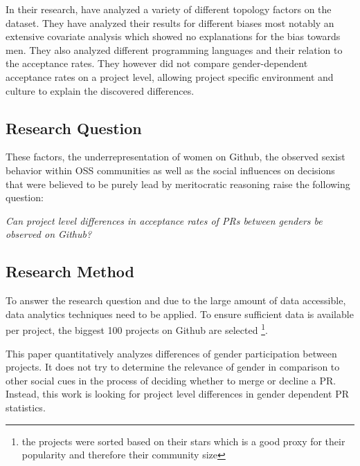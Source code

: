 In their research, \citeauthor{genderdiff:2016} have analyzed a variety of different topology factors on the dataset. They have analyzed their results for different biases most notably an extensive covariate analysis which showed no explanations for the bias towards men. They also analyzed different programming languages and their relation to the acceptance rates. They however did not compare gender-dependent acceptance rates on a project level, allowing project specific environment and culture to explain the discovered differences.

\subsection{Research Question}%
These factors, the underrepresentation of women on Github, the observed sexist behavior within \ac{OSS} communities as well as the social influences on decisions that were believed to be purely lead by meritocratic reasoning raise the following question:%

\emph{Can project level differences in acceptance rates of \ac{PR}s between genders be observed on Github?}


\subsection{Research Method}
To answer the research question and due to the large amount of data accessible, data analytics techniques need to be applied. To ensure sufficient data is available per project, the biggest 100 projects on Github are selected
\footnote{the projects were sorted based on their stars which is a good proxy for their popularity and therefore their community size}.

This paper quantitatively analyzes differences of gender participation between projects. It does not try to determine the relevance of gender in comparison to other social cues in the process of deciding whether to merge or decline a \ac{PR}. Instead, this work is looking for project level differences in gender dependent \ac{PR} statistics. %

